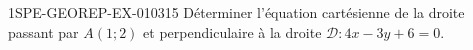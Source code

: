 \begin{exercice}{1SPE-GEOREP-EX-010}{3}{15}
Déterminer l'équation cartésienne de la droite passant par $A(1 ; 2)$ et perpendiculaire à la droite $\mathcal{D} : 4x - 3y + 6 = 0$.
\end{exercice}

